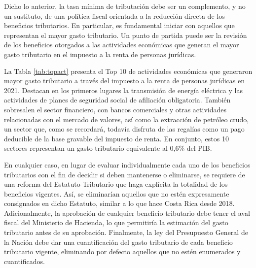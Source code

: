 Dicho lo anterior, la tasa mínima de tributación debe ser un complemento, y no un sustituto, de una política fiscal orientada a la reducción directa de los beneficios tributarios. En particular, es fundamental iniciar con aquellos que representan el mayor gasto tributario. Un punto de partida puede ser la revisión de los beneficios otorgados a las actividades económicas que generan el mayor gasto tributario en el impuesto a la renta de personas jurídicas. 



La Tabla \ref{tab:topact} presenta el Top 10 de actividades económicas que generaron mayor gasto tributario a través del impuesto a la renta de personas jurídicas en 2021. Destacan en los primeros lugares la transmisión de energía eléctrica y las actividades de planes de seguridad social de afiliación obligatoria. También sobresalen el sector financiero, con bancos comerciales y otras actividades relacionadas con el mercado de valores, así como la extracción de petróleo crudo, un sector que, como se recordará, todavía disfruta de las regalías como un pago deducible de la base gravable del impuesto de renta. En conjunto, estos 10 sectores representan un gasto tributario equivalente al 0,6\% del PIB.

En cualquier caso, en lugar de evaluar individualmente cada uno de los beneficios tributarios con el fin de decidir si deben mantenerse o eliminarse, se requiere de una reforma del Estatuto Tributario que haga explícita la totalidad de los beneficios vigentes. Así, se eliminarían aquellos que no estén expresamente consignados en dicho Estatuto, similar a lo que hace Costa Rica desde 2018. Adicionalmente, la aprobación de cualquier beneficio tributario debe tener el aval fiscal del Ministerio de Hacienda, lo que permitiría la estimación del gasto tributario antes de su aprobación.  Finalmente, la ley del Presupuesto General de la Nación debe dar una cuantificación del gasto tributario de cada beneficio tributario vigente, eliminando por defecto aquellos que no estén enumerados y cuantificados. 

